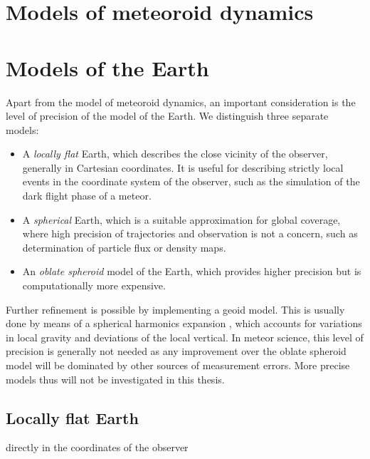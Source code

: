 



\section{Models of meteoroid dynamics} \label{mm}





\section{Models of the Earth}
    Apart from the model of meteoroid dynamics, an important consideration is the level of precision
    of the model of the Earth. We distinguish three separate models:

    \begin{itemize}
        \item A \emph{locally flat} Earth, which describes the close vicinity of the observer,
            generally in Cartesian coordinates. It is useful for describing strictly local events
            in the coordinate system of the observer, such as the simulation of the dark flight phase of a meteor.
        \item A \emph{spherical} Earth, which is a suitable approximation for global coverage,
            where high precision of trajectories and observation is not a concern, such as determination
            of particle flux or density maps.
        \item An \emph{oblate spheroid} model of the Earth, which provides higher
            precision but is computationally more expensive.
    \end{itemize}

    Further refinement is possible by implementing a geoid model. This is usually done by means of
    a spherical harmonics expansion \cite{???}, which accounts for variations in local gravity
    and deviations of the local vertical.
    In meteor science, this level of precision is generally not needed as any improvement over the
    oblate spheroid model will be dominated by other sources of measurement errors.
    More precise models thus will not be investigated in this thesis.


    \subsection{Locally flat Earth} \label{mmf}
     directly in the coordinates of the observer

